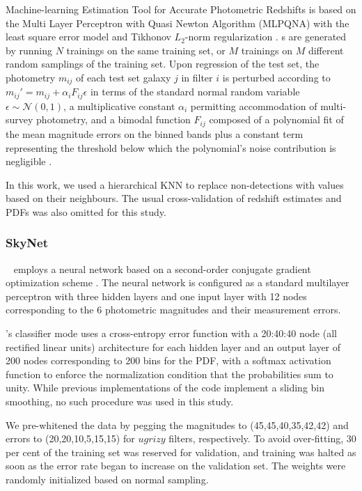 Machine-learning Estimation Tool for Accurate Photometric Redshifts \citep[\metaphor,][]{Cavuoti:17} is based on the Multi Layer Perceptron with Quasi Newton Algorithm (MLPQNA) with the least square error model and Tikhonov $L_{2}$-norm regularization \citep{Hofmann:18}.
\Pzpdf s are generated by running $N$ trainings on the same training set, or $M$ trainings on $M$ different random samplings of the training set.
Upon regression of the test set, the photometry $m_{ij}$ of each test set galaxy $j$ in filter $i$ is perturbed according to $m_{ij}' = m_{ij} + \alpha_{i} F_{ij} \epsilon$ in terms of the standard normal random variable $\epsilon \sim \mathcal{N}(0, 1)$, a multiplicative constant $\alpha_{i}$ permitting accommodation of multi-survey photometry, and a bimodal function $F_{ij}$ composed of a polynomial fit of the mean magnitude errors on the binned bands plus a constant term representing the threshold below which the polynomial's noise contribution is negligible \citep{Brescia:18}.

In this work, we used a hierarchical KNN to replace non-detections with values based on their neighbours.
The usual cross-validation of redshift estimates and PDFs was also omitted for this study.

\subsubsection{SkyNet}
\label{sec:skynet}

\skynet\ \citep{Graff:14} employs a neural network based on a second-order conjugate gradient optimization scheme \citep[see][for further details]{Graff:14}. 
The neural network is configured as a standard multilayer perceptron with three hidden layers and one input layer with 12 nodes corresponding to the 6 photometric magnitudes and their measurement errors.

\skynet's classifier mode uses a cross-entropy error function with a 20:40:40 node (all rectified linear units) architecture for each hidden layer and an output layer of 200 nodes corresponding to 200 bins for the PDF, with a softmax activation function to enforce the normalization condition that the probabilities sum to unity.
While previous implementations of the code \citep[see Appendix C.3 of~][]{Sanchez:14,Bonnett:15} implement a sliding bin smoothing, no such procedure was used in this study.

We pre-whitened the data by pegging the magnitudes to (45,45,40,35,42,42) and errors to (20,20,10,5,15,15) for $ugrizy$ filters, respectively.
To avoid over-fitting, $30$ per cent of the training set was reserved for validation, and training was halted as soon as the error rate began to increase on the validation set.
The weights were randomly initialized based on normal sampling.

